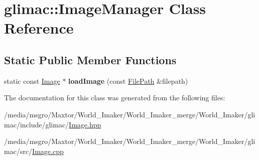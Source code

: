 \hypertarget{classglimac_1_1ImageManager}{}\section{glimac\+:\+:Image\+Manager Class Reference}
\label{classglimac_1_1ImageManager}
\subsection*{Static Public Member Functions}
\begin{DoxyCompactItemize}
\item 
\mbox{\label{classglimac_1_1ImageManager_a491965842042b2ef01eade7136ddb54d}} 
static const \hyperlink{classglimac_1_1Image}{Image} $\ast$ {\bfseries load\+Image} (const \hyperlink{classglimac_1_1FilePath}{File\+Path} \&filepath)
\end{DoxyCompactItemize}


The documentation for this class was generated from the following files\+:\begin{DoxyCompactItemize}
\item 
/media/msgro/\+Maxtor/\+World\+\_\+\+Imaker/\+World\+\_\+\+Imaker\+\_\+merge/\+World\+\_\+\+Imaker/glimac/include/glimac/\hyperlink{Image_8hpp}{Image.\+hpp}\item 
/media/msgro/\+Maxtor/\+World\+\_\+\+Imaker/\+World\+\_\+\+Imaker\+\_\+merge/\+World\+\_\+\+Imaker/glimac/src/\hyperlink{Image_8cpp}{Image.\+cpp}\end{DoxyCompactItemize}
